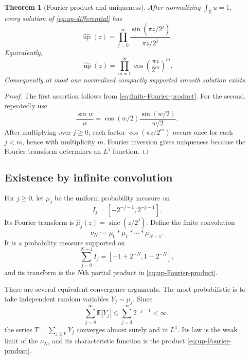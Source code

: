 \documentclass[11pt]{article}
\numberwithin{equation}{section}
\newtheorem{theorem}{Theorem}[section]
\theoremstyle{definition}
\theoremstyle{remark}
\newcommand{\R}{\mathbb R}
\newcommand{\upf}{\operatorname{up}}
\newcommand{\sinc}{\operatorname{sinc}}
\begin{document}
\begin{theorem}[Fourier product and uniqueness]\label{thm:Fourier-product}
After normalizing $\int_\R u=1$, every solution of \eqref{eq:up-differential} has
\begin{equation}\label{eq:up-Fourier-product}
 \widehat{\upf}(z)=\prod_{j=0}^{\infty}\frac{\sin(\pi z/2^j)}{\pi z/2^j}.
\end{equation}
Equivalently,
\begin{equation}\label{eq:cos-product}
 \widehat{\upf}(z)=\prod_{m=1}^{\infty}\cos\!\left(\frac{\pi z}{2^m}\right)^{m}.
\end{equation}
Consequently at most one normalized compactly supported smooth solution exists.
\end{theorem}

\begin{proof}
The first assertion follows from \eqref{eq:finite-Fourier-product}.  For the second, repeatedly use
\[
 \frac{\sin w}{w}=\cos(w/2)\frac{\sin(w/2)}{w/2}.
\]
After multiplying over $j\ge0$, each factor $\cos(\pi z/2^m)$ occurs once for each $j<m$, hence with multiplicity $m$.  Fourier inversion gives uniqueness because the Fourier transform determines an $L^1$ function.
\end{proof}

\subsection{Existence by infinite convolution}

For $j\ge0$, let $\mu_j$ be the uniform probability measure on
\[
 I_j=[-2^{-j-1},2^{-j-1}].
\]
Its Fourier transform is $\widehat\mu_j(z)=\sinc(z/2^j)$.  Define the finite convolution
\begin{equation}\label{eq:finite-convolution}
 \nu_N:=\mu_0*\mu_1*\cdots*\mu_{N-1}.
\end{equation}
It is a probability measure supported on
\[
 \sum_{j=0}^{N-1}I_j=[-1+2^{-N},1-2^{-N}],
\]
and its transform is the $N$th partial product in \eqref{eq:up-Fourier-product}.

There are several equivalent convergence arguments.  The most probabilistic is to take independent random variables $Y_j\sim\mu_j$.  Since
\[
 \sum_{j=0}^{\infty}\mathbb E|Y_j|\le\sum_{j=0}^{\infty}2^{-j-1}<\infty,
\]
the series $T=\sum_{j\ge0}Y_j$ converges almost surely and in $L^1$.  Its law is the weak limit of the $\nu_N$, and its characteristic function is the product \eqref{eq:up-Fourier-product}.
\end{document}
